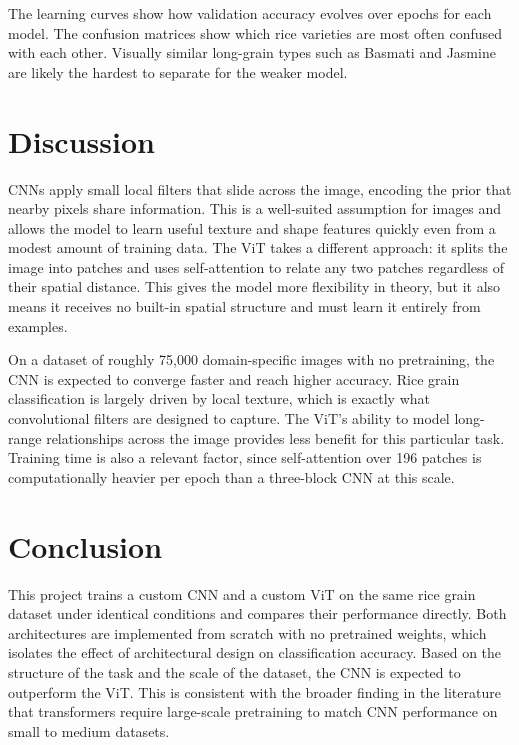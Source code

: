 The learning curves show how validation accuracy evolves over epochs for each model. The confusion matrices show which rice varieties are most often confused with each other. Visually similar long-grain types such as Basmati and Jasmine are likely the hardest to separate for the weaker model.

\section{Discussion}

CNNs apply small local filters that slide across the image, encoding the prior that nearby pixels share information. This is a well-suited assumption for images and allows the model to learn useful texture and shape features quickly even from a modest amount of training data. The ViT takes a different approach: it splits the image into patches and uses self-attention to relate any two patches regardless of their spatial distance. This gives the model more flexibility in theory, but it also means it receives no built-in spatial structure and must learn it entirely from examples.

On a dataset of roughly 75,000 domain-specific images with no pretraining, the CNN is expected to converge faster and reach higher accuracy. Rice grain classification is largely driven by local texture, which is exactly what convolutional filters are designed to capture. The ViT's ability to model long-range relationships across the image provides less benefit for this particular task. Training time is also a relevant factor, since self-attention over 196 patches is computationally heavier per epoch than a three-block CNN at this scale.

\section{Conclusion}

This project trains a custom CNN and a custom ViT on the same rice grain dataset under identical conditions and compares their performance directly. Both architectures are implemented from scratch with no pretrained weights, which isolates the effect of architectural design on classification accuracy. Based on the structure of the task and the scale of the dataset, the CNN is expected to outperform the ViT. This is consistent with the broader finding in the literature that transformers require large-scale pretraining to match CNN performance on small to medium datasets.


